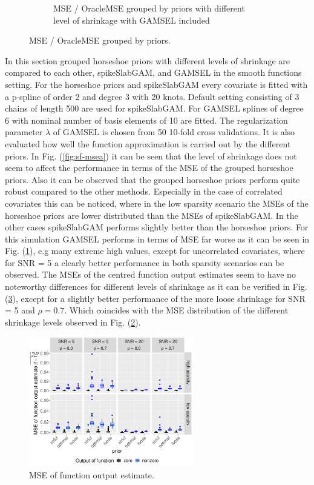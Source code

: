\documentclass[12pt,letterpaper]{article}
\numberwithin{equation}{subsection}
\begin{document}
\begin{figure}[hbt!]
\begin{subfigure}[b]{0.46\textwidth}
\caption {MSE / OracleMSE grouped by priors with different level of shrinkage with GAMSEL included}
 \label{fig:sf-mseb}
 \end{subfigure}
 \caption[MSE / OracleMSE (smooth functions scenario)]{MSE / OracleMSE grouped by priors.}
  \label{fig:sf-mse}
\end{figure} 
In this section grouped horseshoe priors with different levels of shrinkage  are compared to each other, spikeSlabGAM, and GAMSEL in the smooth functions setting. For the horseshoe priors and spikeSlabGAM every covariate is fitted with a p-spline of order 2 and degree 3 with 20 knots. Default setting consisting of 3 chains of length 500 are used for spikeSlabGAM. For GAMSEL splines of degree 6 with nominal number of basis elements of 10 are fitted. The regularization parameter $\lambda$ of GAMSEL is chosen from 50 10-fold cross validations. It is also evaluated how well the function approximation is carried out by the different priors. 
In Fig. (\ref{fig:sf-msea}) it can be seen that the level of shrinkage does not seem to affect the performance in terms of the MSE of the grouped horseshoe priors.
Also it can be observed that the grouped horseshoe priors perform quite robust compared to the other methods. Especially in the case of correlated covariates this can be noticed, where in the low sparsity scenario the MSEs of the horseshoe priors are lower distributed than the MSEs of spikeSlabGAM. In the other cases spikeSlabGAM performs slightly better than the horseshoe priors. For this simulation GAMSEL performs in terms of MSE far worse as it can be seen in Fig. (\ref{fig:sf-mseb}), e.g many extreme high values, except for uncorrelated covariates, where for SNR = 5 a clearly better performance in both sparsity scenarios can be observed. 
The MSEs of the centred function output estimates seem to have no noteworthy differences for different levels of shrinkage as it can be verified in Fig. (\ref{fig:sf-quality}), except for a slightly better performance of the more loose shrinkage for SNR = 5 and $\rho = 0.7$. Which coincides with the MSE distribution of the different shrinkage levels observed in Fig. (\ref{fig:sf-mse}).
\begin{figure}[hbt!]
 \centering
 \includegraphics[width=0.64\textwidth]{../plots/sf-quality.pdf}
 \caption{MSE of function output estimate.}
 \label{fig:sf-quality}
\end{figure}
\FloatBarrier
\pagebreak
\end{document}
